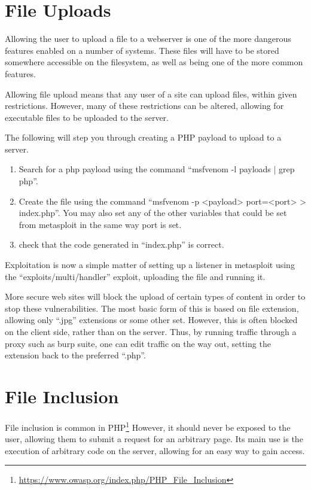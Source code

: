 	\section{File Uploads}
		Allowing the user to upload a file to a webserver is one of the more dangerous features enabled on a number of systems. 
		These files will have to be stored somewhere accessible on the filesystem, as well as being one of the more common features. 

		Allowing file upload means that any user of a site can upload files, within given restrictions. 
		However, many of these restrictions can be altered, allowing for executable files to be uploaded to the server. 

		The following will step you through creating a PHP payload to upload to a server. 
		\begin{enumerate}
			\item Search for a php payload using the command ``msfvenom -l payloads | grep php''. 
			\item Create the file using the command ``msfvenom -p <payload> port=<port> > index.php''.
				You may also set any of the other variables that could be set from metasploit in the same way port is set.
			\item check that the code generated in ``index.php'' is correct. 
		\end{enumerate}

		Exploitation is now a simple matter of setting up a listener in metasploit using the ``exploits/multi/handler'' exploit, uploading the file and running it.

		More secure web sites will block the upload of certain types of content in order to stop these vulnerabilities. 
		The most basic form of this is based on file extension, allowing only ``.jpg'' extensions or some other set. 
		However, this is often blocked on the client side, rather than on the server. 
		Thus, by running traffic through a proxy such as burp suite, 
		one can edit traffic on the way out, setting the extension back to the preferred ``.php''. 
	\section{File Inclusion}
		File inclusion is common in PHP\footnote{\url{https://www.owasp.org/index.php/PHP\_File\_Inclusion}}
		However, it should never be exposed to the user, allowing them to submit a request for an arbitrary page. 
		Its main use is the execution of arbitrary code on the server, allowing for an easy way to gain access. 

